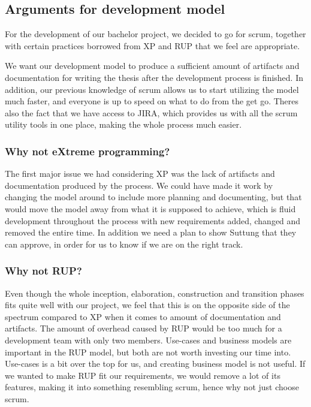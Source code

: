 \subsection{Arguments for development model}
For the development of our bachelor project, we decided to go for  scrum, together with certain practices borrowed from XP and RUP that we feel are appropriate.


We want our development model to produce a sufficient amount of artifacts and documentation for writing the thesis after the development process is finished.
In addition, our previous knowledge of scrum allows us to start utilizing the model much faster, and everyone is up to speed on what to do from the get go.
Theres also the fact that we have access to JIRA, which provides us with all the scrum utility tools in one place, making the whole process much easier.


\subsubsection*{Why not eXtreme programming?}

The first major issue we had considering XP was the lack of artifacts and documentation produced by the process.
We could have made it work by changing the model around to include more planning and documenting, but that would move the model away from what it is supposed to achieve, which is fluid development throughout the process with new requirements added, changed and removed the entire time.
In addition we need a plan to show Suttung that they can approve, in order for us to know if we are on the right track.


\subsubsection*{Why not RUP?}

Even though the whole inception, elaboration, construction and transition phases fits quite well with our project, we feel that this is on the opposite side of the spectrum compared to XP when it comes to amount of documentation and artifacts. 
The amount of overhead caused by RUP would be too much for a development team with only two members.
Use-cases and business models are important in the RUP model, but both are not worth investing our time into.
Use-cases is a bit over the top for us, and creating business model is not useful.
If we wanted to make RUP fit our requirements, we would remove a lot of its features, making it into something resembling scrum, hence why not just choose scrum.


